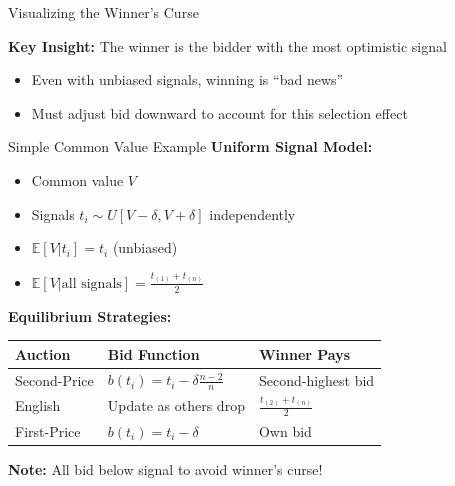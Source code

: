 \documentclass[xcolor={x11names}]{beamer}
\newcommand{\E}{\mathbb{E}}
\begin{document}
\begin{frame}{Visualizing the Winner's Curse}
\begin{center}
\end{center}

\textbf{Key Insight:} The winner is the bidder with the most optimistic signal
\begin{itemize}
  \item Even with unbiased signals, winning is ``bad news''
  \item Must adjust bid downward to account for this selection effect
\end{itemize}
\end{frame}

\begin{frame}{Simple Common Value Example}
\textbf{Uniform Signal Model:}
\begin{itemize}
  \item Common value $V$
  \item Signals $t_i \sim U[V-\delta, V+\delta]$ independently
  \item $\E[V|t_i] = t_i$ (unbiased)
  \item $\E[V|\text{all signals}] = \frac{t_{(1)} + t_{(n)}}{2}$
\end{itemize}


\textbf{Equilibrium Strategies:}

\begin{tabular}{lll}
\toprule
Auction & Bid Function & Winner Pays \\
\midrule
Second-Price & $b(t_i) = t_i - \delta\frac{n-2}{n}$ & Second-highest bid \\
English & Update as others drop & $\frac{t_{(2)} + t_{(n)}}{2}$ \\
First-Price & $b(t_i) = t_i - \delta$ & Own bid \\
\bottomrule
\end{tabular}

\textbf{Note:} All bid below signal to avoid winner's curse!
\end{frame}
\end{document}
